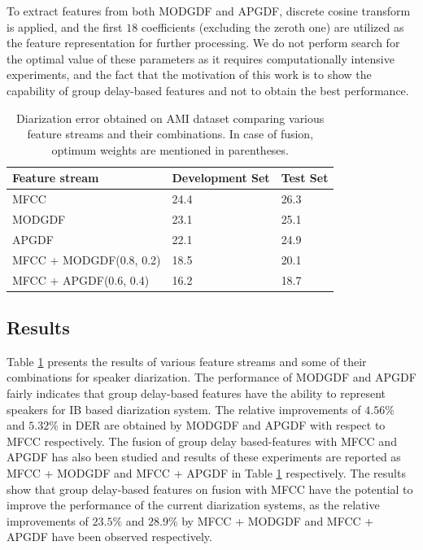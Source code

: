 \documentclass[conference]{IEEEtran}
\begin{document}
To extract features from both MODGDF and APGDF, discrete cosine transform is applied, and the first $18$ coefficients
(excluding the zeroth one) are utilized as the feature representation for further processing. 
We do not perform search for the optimal value of these parameters as it requires computationally intensive experiments, and the fact that the motivation of this work is to show the capability of group delay-based features and not to obtain the best performance. 

\begin{table}[h]
\centering
\begin{tabular}{|l|l|l|}
\hline
Feature stream  & Development Set & Test Set \\ \hline
MFCC          & 24.4                   & 26.3            \\ \hline
MODGDF        & 23.1                   & 25.1            \\ \hline
APGDF         & 22.1                   & 24.9            \\ \hline
MFCC + MODGDF(0.8, 0.2) & 18.5          & 20.1            \\ \hline
MFCC + APGDF(0.6, 0.4)  & 16.2          & 18.7            \\ \hline
\end{tabular}
\vspace{0.4cm}

\caption{Diarization error obtained on AMI dataset comparing various feature
streams and their combinations. In case of fusion, optimum weights are mentioned
in parentheses.}
\label{table:results}
\end{table}


\subsection{Results}

Table \ref{table:results} presents the results of various feature streams and
some of their combinations for speaker diarization. The performance of MODGDF
and APGDF fairly indicates that group delay-based features have the ability to
represent speakers for IB based diarization system. The relative improvements of
$4.56\%$ and $5.32\%$ in DER are obtained by MODGDF and APGDF with respect to
MFCC respectively. The fusion of group delay based-features with MFCC and APGDF
has also been studied and results of these experiments are reported as MFCC +
MODGDF and MFCC + APGDF in Table \ref{table:results} respectively. The results
show that group delay-based features on fusion with MFCC have the potential to
improve the performance of the current diarization systems, as the relative
improvements of $23.5\%$ and $28.9\%$ by MFCC + MODGDF and MFCC + APGDF have
been observed respectively.
\end{document}
